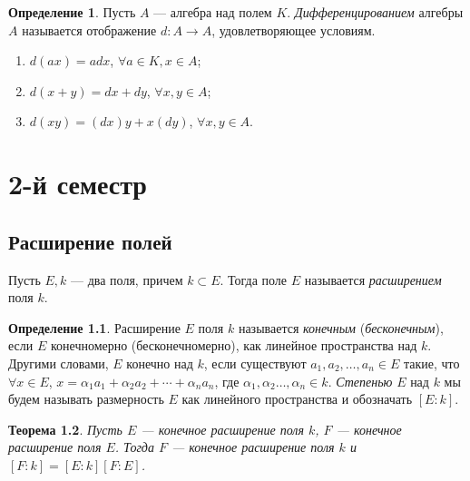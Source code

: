 \documentclass[12pt, titlepage, oneside]{amsbook}
\newtheorem{theorem}{Теорема}[chapter]
\theoremstyle{definition}
\newtheorem{definition}[theorem]{Определение}
\theoremstyle{remark}
\begin{document}
\begin{definition}
	Пусть $A$ --- алгебра над полем $K$. \emph{Дифференцированием} алгебры $A$ называется отображение $d\colon A\rightarrow A$, удовлетворяющее условиям.
	\begin{enumerate}
		\item $d(ax)=adx$, $\forall a\in K, x\in A$;
		\item $d(x+y)=dx+dy$, $\forall x,y\in A$;
		\item $d(xy)=(dx)y+x(dy)$, $\forall x,y\in A$.
	\end{enumerate}
\end{definition}



\chapter{2-й семестр}

\section{Расширение полей}

Пусть $E,k$ --- два поля, причем $k\subset E$. Тогда поле $E$ называется \emph{расширением} поля $k$.

\begin{definition}
	Расширение $E$  поля $k$ называется \emph{конечным} (\emph{бесконечным}), если $E$ конечномерно (бесконечномерно), как линейное пространства над $k$. Другими словами, $E$ конечно над $k$, если существуют $a_1,a_2,\ldots, a_n\in E$ такие, что $\forall x\in E$, $x=\alpha_1 a_1+\alpha_2 a_2+\cdots+\alpha_n a_n$, где $\alpha_1,\alpha_2\ldots,\alpha_n\in k$. \emph{Степенью} $E$ над $k$ мы будем называть размерность $E$ как линейного пространства и обозначать $[E:k]$.
\end{definition}

\begin{theorem}
	\label{Ras1} Пусть $E$ --- конечное расширение поля $k$, $F$ --- конечное расширение поля $E$. Тогда $F$ --- конечное расширение поля $k$ и $[F:k]=[E:k][F:E]$.
\end{theorem}
\end{document}

